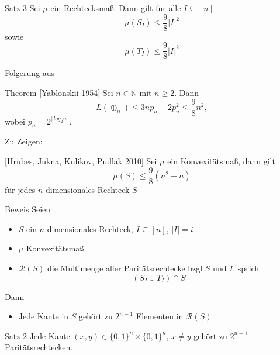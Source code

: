 \begin{frame}
    \begin{block}{Satz 3}
        Sei $\mu$ ein Rechtecksma\ss{}. Dann gilt f\"ur alle $I \subseteq [n]$
        \[
            \mu(S_I) \leq \frac{9}{8} |I|^2
        \]
        sowie
        \[
            \mu(T_I) \leq \frac{9}{8} |I|^2
        \]
    \end{block}
    \pause
    Folgerung aus
     \begin{block}{Theorem [Yablonskii 1954]}
        Sei $n \in \mathbb{N}$ mit $n \geq 2$. Dann
        \[
            L(\oplus_n) \leq 3np_n - 2p_n^2 \leq \frac{9}{8}n^2,
        \]
        wobei $p_n = 2^{\lfloor log_2n\rfloor}$.
    \end{block}
\end{frame}

\begin{frame}{Zu Zeigen:}
    \begin{block}{[Hrubes, Jukna, Kulikov, Pudlak 2010]}
        Sei $\mu$ ein Konvexit\"atsma\ss{}, dann gilt
        \[
            \mu(S) \leq \frac{9}{8} (n^2+n)
        \]
        f\"ur jedes $n$-dimensionales Rechteck $S$
    \end{block}
\end{frame}

\begin{frame}[t]{Beweis}
    Seien
    \begin{itemize}
        \item $S$ ein $n$-dimensionales Rechteck, $I \subseteq [n]$, $|I| = i$
    \end{itemize}
    \pause
    \begin{itemize}
        \item $\mu$ Konvexit\"atsma\ss{}
    \end{itemize}
    \pause
    \begin{itemize}
        \item $\mathcal{R}(S)$ die Multimenge aller Parit\"atsrechtecke bzgl $S$ und $I$, sprich
        \[
            (S_I \cup T_I) \cap S
        \]
    \end{itemize}
    \pause
    Dann
    \begin{itemize}
        \item Jede Kante in $S$ geh\"ort zu $2^{n-1}$ Elementen in $\mathcal{R}(S)$
    \end{itemize}
    \pause
    \begin{block}{Satz 2}
        Jede Kante $(x,y) \in \{0,1\}^n \times \{0,1\}^n$, $x\neq y$ geh\"ort zu $2^{n-1}$ Parit\"atsrechtecken.
    \end{block}
\end{frame}

